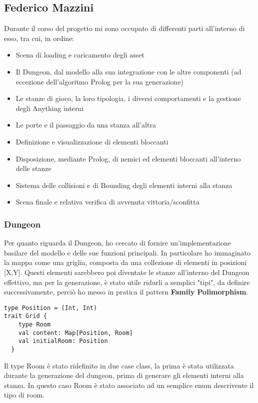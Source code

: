 \subsection{Federico Mazzini}
Durante il corso del progetto mi sono occupato di differenti parti all'interno di esso, tra cui, in ordine:
\begin{itemize}
    \item Scena di loading e caricamento degli asset
    \item Il Dungeon, dal modello alla sua integrazione con le altre componenti (ad eccezione dell'algoritmo Prolog per la sua generazione)
    \item Le stanze di gioco, la loro tipologia, i diversi comportamenti e la gestione degli Anything interni
    \item Le porte e il passaggio da una stanza all'altra
    \item Definizione e visualizzazione di elementi bloccanti
    \item Disposizione, mediante Prolog, di nemici ed elementi bloccanti all'interno delle stanze
    \item Sistema delle collisioni e di Bounding degli elementi interni alla stanza
    \item Scena finale e relativa verifica di avvenuta vittoria/sconfitta
\end{itemize}

\subsubsection{Dungeon}
Per quanto riguarda il Dungeon, ho cercato di fornire un'implementazione basilare del modello e delle sue funzioni principali. 
In particolare ho immaginato la mappa come una griglia, composta da una collezione di elementi in posizioni [X,Y]. Questi elementi sarebbero poi diventate le stanze all'interno del Dungeon effettivo, 
ma per la generazione, è stato utile ridurli a semplici "tipi", da definire successivamente, perciò ho messo in pratica il pattern \textbf{Family Polimorphism}.

\begin{lstlisting}
type Position = (Int, Int)
trait Grid {
    type Room
    val content: Map[Position, Room]
    val initialRoom: Position
  }   
\end{lstlisting}
Il type Room è stato ridefinito in due case class, la prima è stata utilizzata durante la generazione del dungeon, prima di generare gli elementi interni alla stanza. 
In questo caso Room è stato associato ad un semplice enum descrivente il tipo di room. 

